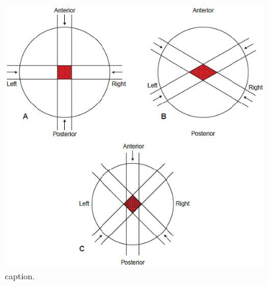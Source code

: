 \documentclass[12pt,a4paper,]{report}
\begin{document}
	\begin{figure}[!h]
	    \centering
        \includegraphics[width = 15cm]{images/multiple_fields_01}
        \caption{caption.}
    \end{figure}
\end{document}
